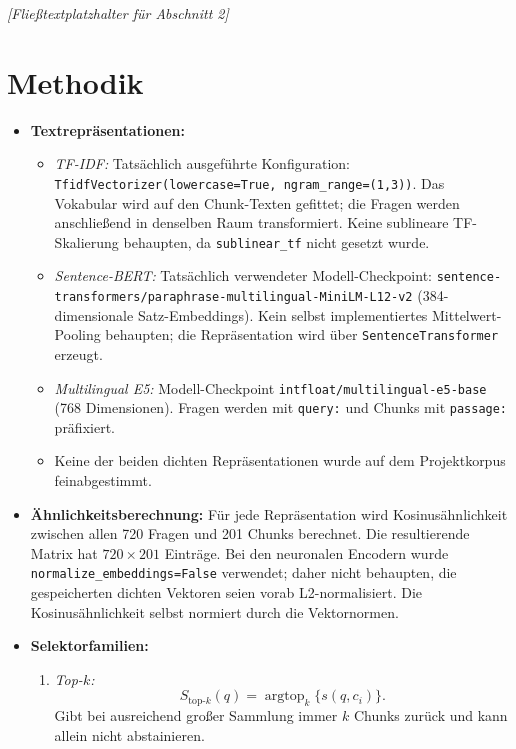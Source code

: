 \documentclass[11pt]{article}
\begin{document}
\textit{[Fließtextplatzhalter für Abschnitt 2]}


\section{Methodik}

\begin{leitfragenbox}
\begin{itemize}
    \item \textbf{Textrepräsentationen:}
    \begin{itemize}
        \item \textit{TF-IDF:} Tats\"achlich ausgef\"uhrte Konfiguration: \texttt{TfidfVectorizer(lowercase=True, ngram\_range=(1,3))}. Das Vokabular wird auf den Chunk-Texten gefittet; die Fragen werden anschlie\ss end in denselben Raum transformiert. Keine sublineare TF-Skalierung behaupten, da \texttt{sublinear\_tf} nicht gesetzt wurde.
        \item \textit{Sentence-BERT:} Tats\"achlich verwendeter Modell-Checkpoint: \nolinkurl{sentence-transformers/paraphrase-multilingual-MiniLM-L12-v2} (384-dimensionale Satz-Embeddings). Kein selbst implementiertes Mittelwert-Pooling behaupten; die Repr\"asentation wird \"uber \texttt{SentenceTransformer} erzeugt.
        \item \textit{Multilingual E5:} Modell-Checkpoint \texttt{intfloat/multilingual-e5-base} (768 Dimensionen). Fragen werden mit \texttt{query:} und Chunks mit \texttt{passage:} pr\"afixiert.
        \item Keine der beiden dichten Repr\"asentationen wurde auf dem Projektkorpus feinabgestimmt.
    \end{itemize}
    \item \textbf{Ähnlichkeitsberechnung:} F\"ur jede Repr\"asentation wird Kosinusähnlichkeit zwischen allen 720 Fragen und 201 Chunks berechnet. Die resultierende Matrix hat $720\times201$ Eintr\"age. Bei den neuronalen Encodern wurde \texttt{normalize\_embeddings=False} verwendet; daher nicht behaupten, die gespeicherten dichten Vektoren seien vorab L2-normalisiert. Die Kosinusähnlichkeit selbst normiert durch die Vektornormen.
    \item \textbf{Selektorfamilien:}
    \begin{enumerate}
        \item \textit{Top-$k$:}
        \[
        S_{\mathrm{top}\text{-}k}(q)=\operatorname{argtop}_k\{s(q,c_i)\}.
        \]
        Gibt bei ausreichend großer Sammlung immer $k$ Chunks zur\"uck und kann allein nicht abstainieren.

\end{enumerate}
\end{itemize}
\end{leitfragenbox}
\end{document}
